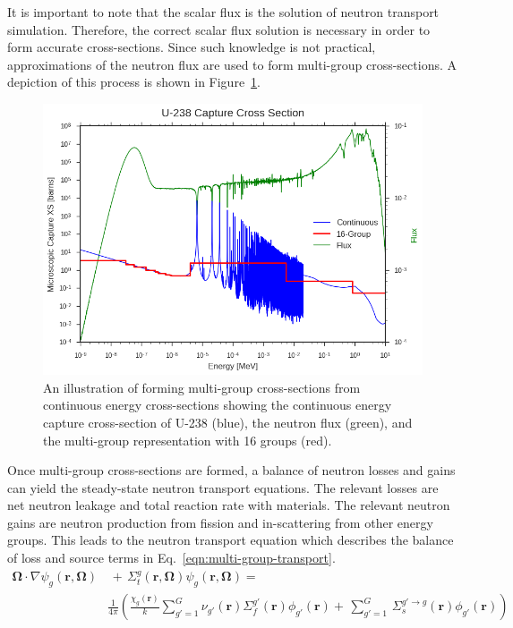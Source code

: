It is important to note that the scalar flux is the solution of neutron transport simulation. Therefore, the correct scalar flux solution is necessary in order to form accurate cross-sections. Since such knowledge is not practical, approximations of the neutron flux are used to form multi-group cross-sections\cite{boyd2017thesis}. A depiction of this process is shown in Figure~\ref{fig:microscopic-to-multigroup}.
\begin{figure}[h!]
	\centering
	\includegraphics[width=0.9\linewidth]{figures/u238-capture-16.png}
	\caption[]{An illustration of forming multi-group cross-sections from continuous energy cross-sections showing the continuous energy capture cross-section of U-238 (blue), the neutron flux (green), and the multi-group representation with 16 groups (red).}
	\label{fig:microscopic-to-multigroup}
\end{figure}
Once multi-group cross-sections are formed, a balance of neutron losses and gains can yield the steady-state neutron transport equations. The relevant losses are net neutron leakage and total reaction rate with materials. The relevant neutron gains are neutron production from fission and in-scattering from other energy groups. This leads to the neutron transport equation\cite{henry, duderstadt, duderstadt-martin, bell1967transport, hebert2009applied} which describes the balance of loss and source terms in Eq.~\ref{eqn:multi-group-transport}.
\begin{equation}
\begin{split}
\mathbf{\Omega} \cdot \nabla \psi_{g}(\mathbf{r},\mathbf{\Omega}) & \, + \, \Sigma_t^{g}(\mathbf{r},\mathbf{\Omega}) \psi_{g}(\mathbf{r},\mathbf{\Omega}) =  \\
& \frac{1}{4 \pi} \left( \frac{\chi_{g}\left(\mathbf{r}\right)}{k} \sum_{g'=1}^{G} \nu_{g'}\left(\mathbf{r}\right) \Sigma_f^{g'}\left(\mathbf{r}\right) \phi_{g'}\left(\mathbf{r}\right) + \, \sum_{g'=1}^G \,  \Sigma_{s}^{g' \rightarrow g}\left(\mathbf{r}\right) \phi_{g'}(\mathbf{r}) \right)
\end{split}
\label{eqn:multi-group-transport}
\end{equation}
